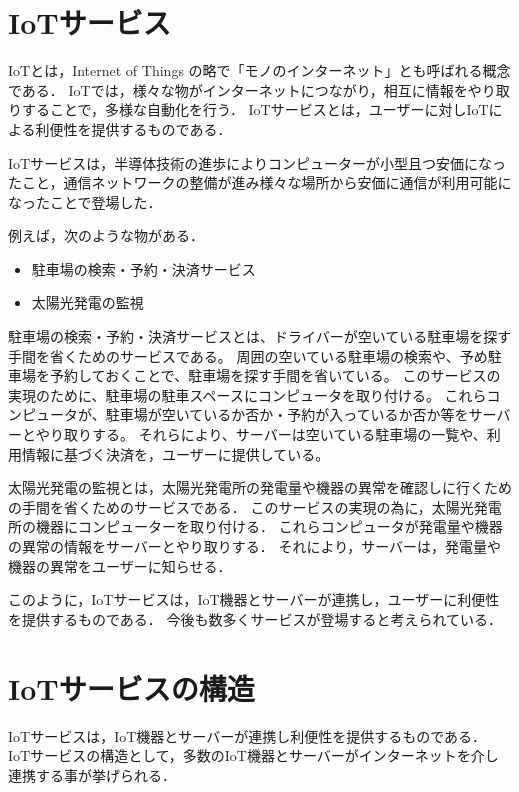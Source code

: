 \section{IoTサービス}
IoTとは，Internet of Things の略で「モノのインターネット」とも呼ばれる概念である．
IoTでは，様々な物がインターネットにつながり，相互に情報をやり取りすることで，多様な自動化を行う．
IoTサービスとは，ユーザーに対しIoTによる利便性を提供するものである．
\medskip

IoTサービスは，半導体技術の進歩によりコンピューターが小型且つ安価になったこと，通信ネットワークの整備が進み様々な場所から安価に通信が利用可能になったことで登場した．
\medskip

例えば，次のような物がある．
\begin{itemize}
	\item 駐車場の検索・予約・決済サービス
	\item 太陽光発電の監視
\end{itemize}

駐車場の検索・予約・決済サービスとは、ドライバーが空いている駐車場を探す手間を省くためのサービスである。
周囲の空いている駐車場の検索や、予め駐車場を予約しておくことで、駐車場を探す手間を省いている。
このサービスの実現のために、駐車場の駐車スペースにコンピュータを取り付ける。
これらコンピュータが、駐車場が空いているか否か・予約が入っているか否か等をサーバーとやり取りする。
それらにより、サーバーは空いている駐車場の一覧や、利用情報に基づく決済を，ユーザーに提供している。
\medskip

太陽光発電の監視とは，太陽光発電所の発電量や機器の異常を確認しに行くための手間を省くためのサービスである．
このサービスの実現の為に，太陽光発電所の機器にコンピューターを取り付ける．
これらコンピュータが発電量や機器の異常の情報をサーバーとやり取りする．
それにより，サーバーは，発電量や機器の異常をユーザーに知らせる．
\medskip

このように，IoTサービスは，IoT機器とサーバーが連携し，ユーザーに利便性を提供するものである．
今後も数多くサービスが登場すると考えられている．

\section{IoTサービスの構造}
IoTサービスは，IoT機器とサーバーが連携し利便性を提供するものである．
IoTサービスの構造として，多数のIoT機器とサーバーがインターネットを介し連携する事が挙げられる．
\medskip

